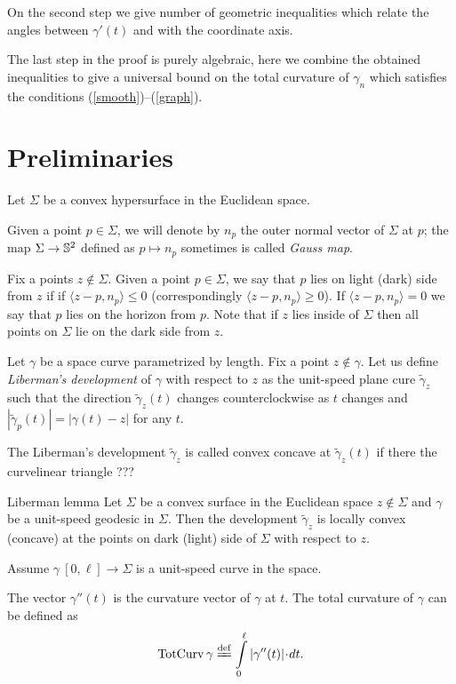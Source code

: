 \documentclass[a4paper,10pt]{amsart}
\begin{document}
On the second step we give number of geometric inequalities which relate the angles between $\gamma'(t)$ and with the coordinate axis.

The last step in the proof is purely algebraic, 
here we combine the obtained inequalities to give a universal bound on the total curvature 
of $\gamma_n$ 
which satisfies the conditions (\ref{smooth})--(\ref{graph}).


\section{Preliminaries}

Let $\Sigma$ be a convex hypersurface in the Euclidean space.

Given a point $p\in \Sigma$, we will denote by $n_p$ the outer normal vector of $\Sigma$ at $p$;
the map $\Sigma\to\mathbb{S}^2$ defined as $p\mapsto n_p$ sometimes is called \emph{Gauss map}.

Fix a points $z\notin\Sigma$.
Given a point $p\in \Sigma$,
we say that $p$ lies on light (dark) side from $z$ if 
if $\langle z-p,n_p\rangle\le 0$ (correspondingly $\langle z-p,n_p\rangle\ge 0$).
If $\langle z-p,n_p\rangle= 0$ we say that $p$ lies on the horizon
from $p$.
Note that if $z$ lies inside of $\Sigma$ then all points on $\Sigma$ lie on the dark side from $z$.

Let $\gamma$ be a space curve 
parametrized by length.
Fix a point $z\notin\gamma$. 
Let us define \emph{Liberman's development} of $\gamma$ with respect to $z$ as the unit-speed plane cure $\tilde\gamma_z$ such that the direction $\tilde\gamma_z(t)$
changes counterclockwise as $t$ changes
and
$|\tilde\gamma_p(t)|=|\gamma(t)-z|$ for any $t$.

The Liberman's development $\tilde\gamma_z$ is called convex concave at $\tilde\gamma_z(t)$ if there the curvelinear triangle ??? 


\begin{thm}{Liberman lemma}\label{lem:liberman}
Let $\Sigma$ be a convex surface in the Euclidean space 
$z\not\in\Sigma$ and $\gamma$ be a unit-speed geodesic in $\Sigma$.
Then the development $\tilde\gamma_z$ is locally convex (concave) 
at the points on dark (light) side of $\Sigma$ with respect to $z$.
\end{thm}

Assume $\gamma\:[0,\ell]\to \Sigma$ is a unit-speed curve in the space.

The vector $\gamma''(t)$ is the curvature vector of $\gamma$ at $t$.
The total curvature of $\gamma$ can be defined as 
\[\tc\gamma\df\int\limits_0^\ell|\gamma''(t)|\cdot dt.\]
\end{document}
